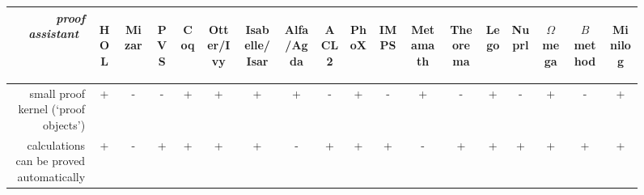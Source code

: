 \documentclass{llncs}
\begin{document}
\bigskip
\noindent
\begin{figure}
\centering
\begin{tabular}{|r|ccccc|ccccc|ccccc|cc|}\hline
~{\it proof assistant}~
&\begin{sideways}HOL\end{sideways}
&\begin{sideways}Mizar\end{sideways}
&\begin{sideways}PVS\end{sideways}
&\begin{sideways}Coq\end{sideways}
&\begin{sideways}Otter/Ivy\end{sideways}
&\begin{sideways}Isabelle/Isar\end{sideways}
&\begin{sideways}Alfa/Agda\end{sideways}
&\begin{sideways}ACL2\end{sideways}
&\begin{sideways}PhoX\end{sideways}
&\begin{sideways}IMPS\end{sideways}
&\begin{sideways}Metamath\end{sideways}
&\begin{sideways}Theorema\end{sideways}
&\begin{sideways}Lego\end{sideways}
&\begin{sideways}Nuprl\end{sideways}
&\begin{sideways}$\Omega$mega\end{sideways}
&\begin{sideways}$B$ method\end{sideways}
&\begin{sideways}Minilog\end{sideways}\\
\hline
small proof kernel (`proof objects')
&+ &- &- &+  &+ &+ &+ &-  &+ &- &+ &-  &+ &- &+ &-  &+ 
\\
calculations can be proved automatically
&+ &- &+ &+  &+ &+ &- &+  &+ &+ &- &+  &+ &+ &+ &+  &+ 
\\

\end{tabular}
\end{figure}
\end{document}
